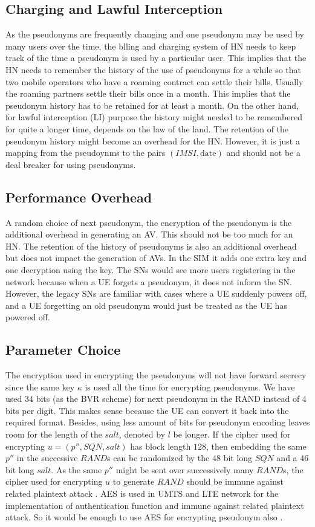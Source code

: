 \documentclass{llncs} %
\begin{document}
\subsection{Charging and Lawful Interception}
As the pseudonyms are frequently changing and one pseudonym may be used by many users over the time, the blling and charging system of HN needs to keep track of the time a pseudonym is used by a particular user. This implies that the HN needs to remember the history of the use of pseudonyms for a while so that two mobile operators who have a roaming contract can settle their bills. Usually the roaming partners settle their bills once in a month. This implies that the pseudonym history has to be retained for at least a month. On the other hand, for lawful interception (LI) purpose the history might needed to be remembered for quite a longer time, depends on the law of the land. The retention of the pseudonym history might become an overhead for the HN. However, it is just a mapping from the pseudoynms to the pairs $(IMSI,\text{date})$ and should not be a deal breaker for using pseudonyms.

\subsection{Performance Overhead}
A random choice of next pseudonym, the encryption of the pseudonym is the additional overhead in generating an AV. This should not be too much for an HN. The retention of the history of pseudonyms is also an additional overhead but does not impact the generation of AVs. In the SIM it adds one extra key and one decryption using the key. The SNs would see more users registering in the network because when a UE forgets a pseudonym, it does not inform the SN. However, the legacy SNs are familiar with cases where a UE suddenly powers off, and a UE forgetting an old pseudonym would just be treated as the UE has powered off.

\subsection{Parameter Choice}
The encryption used in encrypting the pseudonyms will not have forward secrecy since the same key $\kappa$ is used all the time for encrypting pseudonyms. We have used $34$ bits (as the BVR scheme) for next pseudonym in the RAND instead of $4$ bits per digit. This makes sense because the UE can convert it back into the required format. Besides, using less amount of bits for pseudonym encoding leaves room for the length of the $salt$, denoted by $l$ be longer. If the cipher used for encrypting $u=\left(p'',SQN,salt\right)$ has block length $128$, then embedding the same $p''$ in the successive $RAND$s can be randomized by the $48$ bit long $SQN$ and a $46$ bit long $salt$. As the same $p''$ might be sent over successively many $RAND$s, the cipher used for encrypting $u$ to generate $RAND$ should be immune against related plaintext attack \cite{CCS15}. AES is used in UMTS and LTE network for the implementation of authentication function and immune against related plaintext attack. So it would be enough to use AES for encrypting pseudonym also \cite{CCS15}. 
\end{document}
